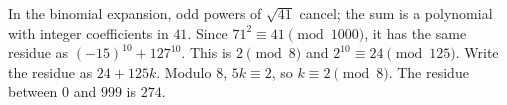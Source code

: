 In the binomial expansion, odd powers of $\sqrt{41}$ cancel; the sum is a polynomial with integer coefficients in $41$. Since $71^2\equiv41\pmod{1000}$, it has the same residue as $(-15)^{10}+127^{10}$. This is $2\pmod8$ and $2^{10}\equiv24\pmod{125}$. Write the residue as $24+125k$. Modulo $8$, $5k\equiv2$, so $k\equiv2\pmod8$. The residue between $0$ and $999$ is $\boxed{274}$.
